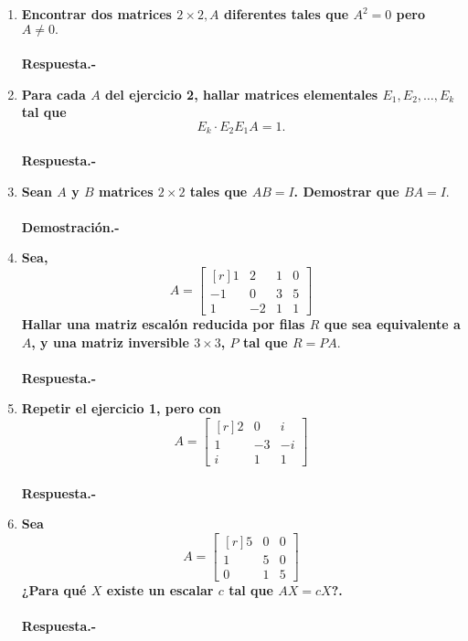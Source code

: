 
\begin{enumerate}

    \item \textbf{\boldmath Encontrar dos matrices $2\times 2,A$ diferentes tales que $A^2=0$ pero $A\neq 0.$\\\\
	Respuesta.-}\;

    \item \textbf{\boldmath Para cada $A$ del ejercicio 2, hallar matrices elementales $E_1,E_2,\ldots,E_k$ tal que 
	$$E_k\cdot E_2E_1A=1.$$\\
    Respuesta.-}\;

    \item \textbf{\boldmath Sean $A$ y $B$ matrices $2\times 2$ tales que $AB=I$. Demostrar que $BA=I.$\\\\
	Demostración.-}\;

    \item \textbf{\boldmath Sea,
	$$A=\begin{bmatrix*}[r]
	    1 & 2 & 1 & 0\\
	    -1 & 0 & 3 & 5\\
	    1 & -2 & 1 & 1
    \end{bmatrix*}$$
    Hallar una matriz escalón reducida por filas $R$ que sea equivalente a $A$, y una matriz inversible $3\times 3$, $P$ tal que $R=PA.$\\\\
	Respuesta.-}\;

    \item \textbf{\boldmath Repetir el ejercicio 1, pero con 
	$$A=\begin{bmatrix*}[r]
	    2 & 0 & i\\
	    1 & -3 & -i\\
	    i & 1 & 1
	\end{bmatrix*}$$\\
	Respuesta.-}\;

    \item \textbf{\boldmath Sea 
	$$A=\begin{bmatrix*}[r]
	    5&0&0\\
	    1&5&0\\
	    0&1&5
	\end{bmatrix*}$$
	¿Para qué $X$ existe un escalar $c$ tal que $AX=cX$?.\\\\
	Respuesta.-}\;


\end{enumerate}
